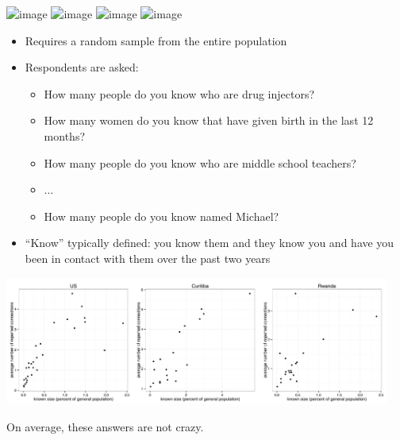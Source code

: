 \documentclass[aspectratio=169]{beamer}
\begin{document}
\begin{frame}

\begin{center}
\includegraphics<1>[width=0.6\textwidth]{figures/network-noedges}
\includegraphics<2>[width=0.6\textwidth]{figures/network-edges}
\includegraphics<3>[width=0.6\textwidth]{figures/network-edges-sample}
\includegraphics<4>[width=0.6\textwidth]{figures/network-edges-sample-ego}
\end{center}
\Large{
\begin{center}
\end{center}
}

\end{frame}
\begin{frame}

\begin{itemize}
\item Requires a random sample from the entire population 
\item Respondents are asked:
\begin{itemize}
\item How many people do you know who are drug injectors? 
\item How many women do you know that have given birth in the last 12 months?
\item How many people do you know who are middle school teachers?
\item $\ldots$
\item How many people do you know named Michael?
\end{itemize}
\item ``Know'' typically defined: you know them and they know you and have you been in contact with them over the past two years
\end{itemize}

\end{frame}
\begin{frame}

\begin{center}
\includegraphics[width=0.95\textwidth]{figures/three_studies_truesize_known}
\end{center}
\vfill
On average, these answers are not crazy.

\end{frame}
\end{document}
